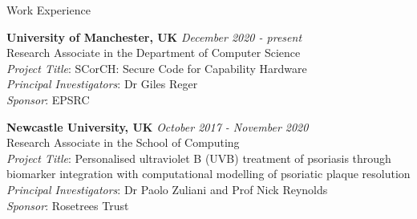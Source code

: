 \documentclass{resume} %
\begin{document}
\begin{rSection}{Work Experience}

{\bf University of Manchester, UK} \hfill {\em December 2020 - present} \\
Research Associate in the Department of Computer Science \\
{\em Project Title}: SCorCH: Secure Code for Capability Hardware \\
{\em Principal Investigators}: Dr Giles Reger \\
{\em Sponsor}: EPSRC %

\smallskip 

{\bf Newcastle University, UK} \hfill {\em October 2017 - November 2020} \\
Research Associate in the School of Computing \\
{\em Project Title}: Personalised ultraviolet B (UVB) treatment of psoriasis through biomarker 
integration with computational modelling of psoriatic plaque resolution \\
{\em Principal Investigators}: Dr Paolo Zuliani and Prof Nick Reynolds \\
{\em Sponsor}: Rosetrees Trust %
\end{rSection}

\vspace{1ex}

\end{document}
